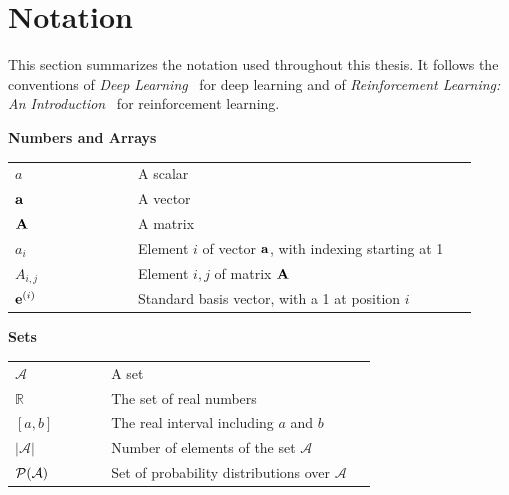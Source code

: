 \chapter*{Notation}
\label{chap:notation}

\newenvironment{notationgroup}[1]{%
  \par\medskip\Needspace{6\baselineskip}\renewcommand{\arraystretch}{1.3}
  \begin{center}\textbf{#1}\end{center}
  \begin{longtable}{@{}>{\centering\arraybackslash}p{0.25\linewidth}p{0.69\linewidth}@{}}
}{%
  \end{longtable}
}

This section summarizes the notation used throughout this thesis.
It follows the conventions of \emph{Deep Learning}~\parencite{goodfellow2016deep} for deep learning and of \emph{Reinforcement Learning: An Introduction}~\parencite{sutton2018reinforcement} for reinforcement learning.

\begin{notationgroup}{Numbers and Arrays}
$a$ & A scalar \\
$\mathbf{a}$ & A vector \\
$\mathbf{A}$ & A matrix \\
$a_i$ & Element $i$ of vector $\mathbf{a}$, with indexing starting at 1 \\
$A_{i,j}$ & Element $i, j$ of matrix $\mathbf{A}$ \\
$\mathbf{e}^{(i)}$ & Standard basis vector, with a 1 at position $i$ \\
\end{notationgroup}

\begin{notationgroup}{Sets}
$\mathcal{A}$ & A set \\
$\mathbb{R}$ & The set of real numbers \\
$[a, b]$ & The real interval including $a$ and $b$ \\
$|\mathcal{A}|$ & Number of elements of the set $\mathcal{A}$ \\
$\mathcal{P}(\mathcal{A})$ & Set of probability distributions over $\mathcal{A}$ \\
\end{notationgroup}

